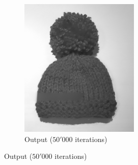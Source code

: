 \documentclass{paper}
\begin{document}
\begin{figure}[ht]
\begin{subfigure}[ht]{0.45\textwidth}
	\includegraphics[width=\textwidth]{hat-iter50000-lambda100-alpha0_001}
	\caption*{Output ($50'000$ iterations)}
\end{subfigure}


\end{figure}
\end{document}
